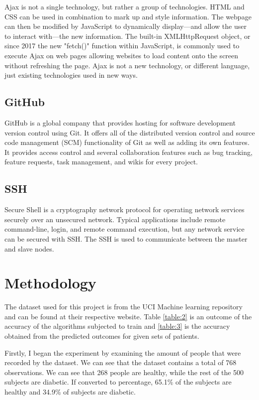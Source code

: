 \documentclass[12pt]{article}
\begin{document}
Ajax is not a single technology, but rather a group of technologies. HTML and CSS can be used in combination to mark up and style information. The webpage can then be modified by JavaScript to dynamically display—and allow the user to interact with—the new information. The built-in XMLHttpRequest object, or since 2017 the new "fetch()" function within JavaScript, is commonly used to execute Ajax on web pages allowing websites to load content onto the screen without refreshing the page. Ajax is not a new technology, or different language, just existing technologies used in new ways.

\subsection{GitHub}
GitHub is a global company that provides hosting for software development version control using Git. It offers all of the distributed version control and source code management (SCM) functionality of Git as well as adding its own features. It provides access control and several collaboration features such as bug tracking, feature requests, task management, and wikis for every project.

\subsection{SSH}
Secure Shell is a cryptography network protocol for operating network services securely over an unsecured network. Typical applications include remote command-line, login, and remote command execution, but any network service can be secured with SSH. The SSH is used to communicate between the master and slave nodes.

\newpage
\section{Methodology}
The dataset used for this project is from the UCI Machine learning repository and can be found at their respective website. Table \ref{table:2} is an outcome of the accuracy of the algorithms subjected to train and \ref{table:3} is the accuracy obtained from the predicted outcomes for given sets of patients.

Firstly, I began the experiment by examining the amount of people that were recorded by the dataset. We can see that the dataset contains a total of 768 observations. We can see that 268 people are healthy, while the rest of the 500 subjects are diabetic. If converted to percentage, 65.1\% of the subjects are healthy and 34.9\% of subjects are diabetic.
\end{document}
